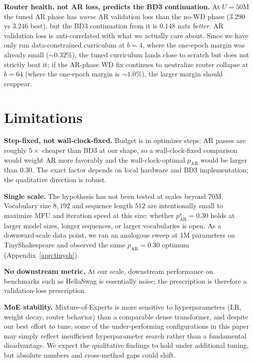 \documentclass{article}
\newcommand{\pAR}{p_{\mathrm{AR}}}
\begin{document}
\textbf{Router health, not AR loss, predicts the BD3 continuation.} At $U{=}50$M the tuned AR phase has \emph{worse} AR validation loss than the no-WD phase ($3.290$ vs $3.246$ best), but the BD3 continuation from it is $0.148$ nats \emph{better}. AR validation loss is anti-correlated with what we actually care about. Since we have only run data-constrained curriculum at $b{=}4$, where the one-epoch margin was already small (${\sim}0.32\%$), the tuned curriculum lands close to scratch but does not strictly beat it; if the AR-phase WD fix continues to neutralize router collapse at $b{=}64$ (where the one-epoch margin is ${\sim}1.0\%$), the larger margin should reappear.

\section{Limitations}
\label{sec:limitations}

\textbf{Step-fixed, not wall-clock-fixed.} Budget is in optimizer steps; AR passes are roughly $5\times$ cheaper than BD3 at our shape, so a wall-clock-fixed comparison would weight AR more favorably and the wall-clock-optimal $\pAR$ would be larger than $0.30$. The exact factor depends on local hardware and BD3 implementation; the qualitative direction is robust.

\textbf{Single scale.} The hypothesis has not been tested at scales beyond 70M. Vocabulary size $8{,}192$ and sequence length $512$ are intentionally small to maximize MFU and iteration speed at this size; whether $\pAR^\star{=}0.30$ holds at larger model sizes, longer sequences, or larger vocabularies is open. As a downward-scale data point, we ran an analogous sweep at 1M parameters on TinyShakespeare and observed the same $\pAR{=}0.30$ optimum (Appendix~\ref{app:tinysh}).

\textbf{No downstream metric.} At our scale, downstream performance on benchmarks such as HellaSwag is essentially noise; the prescription is therefore a validation-loss prescription.

\textbf{MoE stability.} Mixture-of-Experts is more sensitive to hyperparameters (LR, weight decay, router behavior) than a comparable dense transformer, and despite our best effort to tune, some of the under-performing configurations in this paper may simply reflect insufficient hyperparameter search rather than a fundamental disadvantage. We expect the qualitative findings to hold under additional tuning, but absolute numbers and cross-method gaps could shift.
\end{document}
